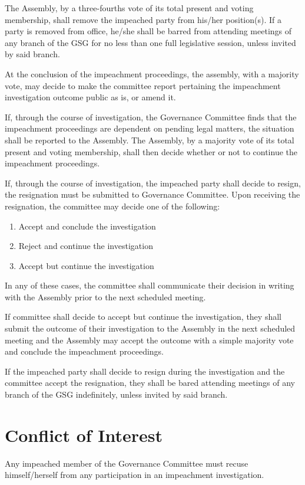 \begin{bylaws-number}
\begin{bylaws-number}
		\item The Assembly, by a three-fourths vote of its total present and voting membership, shall remove the impeached party from his/her position(s). If a party is removed from office, he/she shall be barred from attending meetings of any branch of the GSG for no less than one full legislative session, unless invited by said branch.
		\item At the conclusion of the impeachment proceedings, the assembly, with a majority vote, may decide to make the committee report pertaining the impeachment investigation outcome public as is, or amend it.
	\end{bylaws-number}
	\item If, through the course of investigation, the Governance Committee finds that the impeachment proceedings are dependent on pending legal matters, the situation shall be reported to the Assembly. The Assembly, by a majority vote of its total present and voting membership, shall then decide whether or not to continue the impeachment proceedings.
	\item If, through the course of investigation, the impeached party shall decide to resign, the resignation must be submitted to Governance Committee. Upon receiving the resignation, the committee may decide one of the following:
	\begin{enumerate}[i]
		\item Accept and conclude the investigation
		\item Reject and continue the investigation
		\item Accept but continue the investigation
	\end{enumerate}
	\begin{bylaws-number}
		\item In any of these cases, the committee shall communicate their decision in writing with the Assembly prior to the next scheduled meeting.
		\item If committee shall decide to accept but continue the investigation, they shall submit the outcome of their investigation to the Assembly in the next scheduled meeting and the Assembly may accept the outcome with a simple majority vote and conclude the impeachment proceedings.
		\item If the impeached party shall decide to resign during the investigation and the committee accept the resignation, they shall be bared attending meetings of any branch of the GSG indefinitely, unless invited by said branch.
	\end{bylaws-number}
\end{bylaws-number}


\section{Conflict of Interest}
Any impeached member of the Governance Committee must recuse himself/herself from any participation in an impeachment investigation.